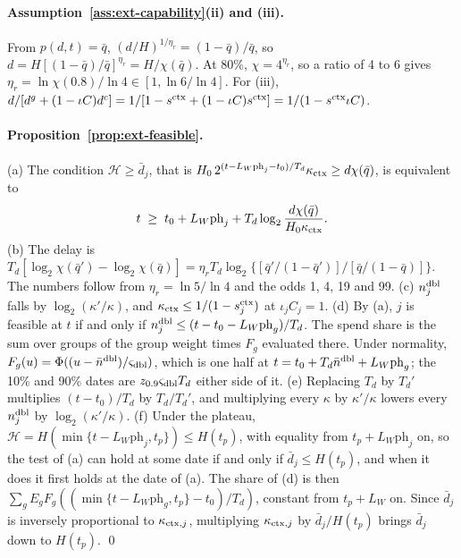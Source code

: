 \paragraph{Assumption~\ref{ass:ext-capability}(ii) and (iii).} From $p(d,t)=\bar q$, $(d/H)^{1/\eta_r}=(1-\bar q)/\bar q$, so $d=H[(1-\bar q)/\bar q]^{\eta_r}=H/\chi(\bar q)$. At 80\%, $\chi=4^{\eta_r}$, so a ratio of 4 to 6 gives $\eta_r=\ln\chi(0.8)/\ln4\in[1,\ln6/\ln4]$. For (iii), $d/[d^g+(1-\iota C)d^c]=1/[1-s^{\rm ctx}+(1-\iota C)s^{\rm ctx}]=1/(1-s^{\rm ctx}\iota C)$.

\paragraph{Proposition~\ref{prop:ext-feasible}.} (a) The condition $\mathcal H\ge\bar d_j$, that is $H_0\,2^{(t-L_W\mathrm{ph}_j-t_0)/T_d}\kappa_{\rm ctx}\ge d\chi(\bar q)$, is equivalent to
\[
t\;\ge\;t_0+L_W\mathrm{ph}_j+T_d\log_2\frac{d\chi(\bar q)}{H_0\kappa_{\rm ctx}}.
\] (b) The delay is $T_d[\log_2\chi(\bar q')-\log_2\chi(\bar q)]=\eta_rT_d\log_2\{[\bar q'/(1-\bar q')]/[\bar q/(1-\bar q)]\}$. The numbers follow from $\eta_r=\ln5/\ln4$ and the odds 1, 4, 19 and 99. (c) $n^{\rm dbl}_j$ falls by $\log_2(\kappa'/\kappa)$, and $\kappa_{\rm ctx}\le1/(1-s^{\rm ctx}_j)$ at $\iota_jC_j=1$. (d) By (a), $j$ is feasible at $t$ if and only if $n^{\rm dbl}_j\le(t-t_0-L_W\mathrm{ph}_g)/T_d$. The spend share is the sum over groups of the group weight times $F_g$ evaluated there. Under normality, $F_g(u)=\Phi((u-\bar n^{\rm dbl})/\varsigma_{\rm dbl})$, which is one half at $t=t_0+T_d\bar n^{\rm dbl}+L_W\mathrm{ph}_g$; the 10\% and 90\% dates are $z_{0.9}\varsigma_{\rm dbl}T_d$ either side of it. (e) Replacing $T_d$ by $T_d'$ multiplies $(t-t_0)/T_d$ by $T_d/T_d'$, and multiplying every $\kappa$ by $\kappa'/\kappa$ lowers every $n^{\rm dbl}_j$ by $\log_2(\kappa'/\kappa)$. (f) Under the plateau, $\mathcal H=H(\min\{t-L_W\mathrm{ph}_j,t_p\})\le H(t_p)$, with equality from $t_p+L_W\mathrm{ph}_j$ on, so the test of (a) can hold at some date if and only if $\bar d_j\le H(t_p)$, and when it does it first holds at the date of (a). The share of (d) is then $\sum_gE_gF_g((\min\{t-L_W\mathrm{ph}_g,t_p\}-t_0)/T_d)$, constant from $t_p+L_W$ on. Since $\bar d_j$ is inversely proportional to $\kappa_{{\rm ctx},j}$, multiplying $\kappa_{{\rm ctx},j}$ by $\bar d_j/H(t_p)$ brings $\bar d_j$ down to $H(t_p)$. \qed


